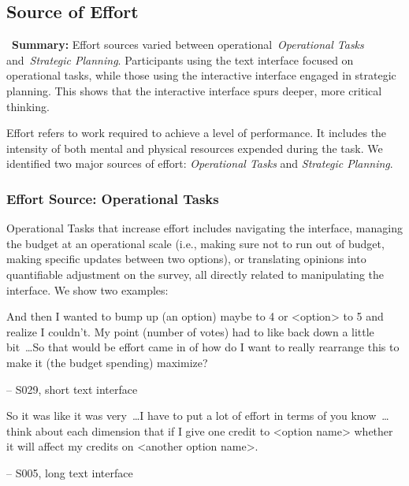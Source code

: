 \subsection{Source of Effort}
\label{sec:effort}

\vspace{5pt}
\begin{tldrbox}
    \faInfoCircle~\xspace\textbf{Summary:} Effort sources varied between operational~\textit{Operational Tasks} and~\textit{Strategic Planning}. Participants using the text interface focused on operational tasks, while those using the interactive interface engaged in strategic planning. This shows that the interactive interface spurs deeper, more critical thinking.
\end{tldrbox}
Effort refers to work required to achieve a level of performance. It includes the intensity of both mental and physical resources expended during the task. We identified two major sources of effort: \textit{Operational Tasks} and \textit{Strategic Planning}.

\subsubsection{Effort Source: Operational Tasks} Operational Tasks that increase effort includes navigating the interface, managing the budget at an operational scale (i.e., making sure not to run out of budget, making specific updates between two options), or translating opinions into quantifiable adjustment on the survey, all directly related to manipulating the interface. We show two examples:

\begin{displayquote}
And then I wanted to bump up (an option) maybe to 4 or <option> to 5 and realize I couldn't. My point (number of votes) had to like back down a little bit~\ldots So that would be effort came in of how do I want to really rearrange this to make it (the budget spending) maximize?

\noindent \hfill -- S029, short text interface
\end{displayquote}

\begin{displayquote}
So it was like it was very~\ldots I have to put a lot of effort in terms of you know~\ldots think about each dimension that if I give one credit to <option name> whether it will affect my credits on <another option name>.

\noindent \hfill -- S005, long text interface
\end{displayquote}

